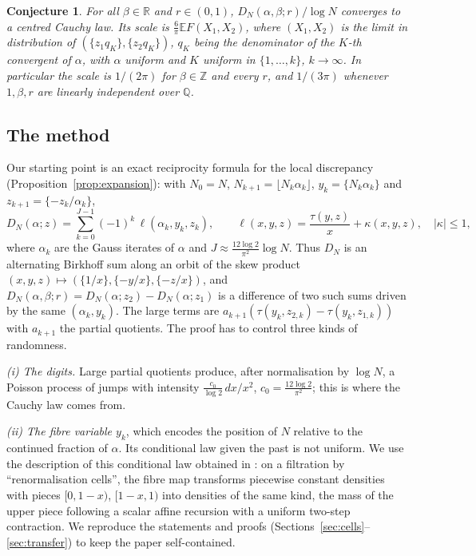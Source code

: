 \documentclass[11pt]{amsart}
\newtheorem{conjecture}[theorem]{Conjecture}
\theoremstyle{definition}
\numberwithin{equation}{section}
\newcommand{\R}{\mathbb{R}}
\newcommand{\Z}{\mathbb{Z}}
\newcommand{\Q}{\mathbb{Q}}
\newcommand{\E}{\mathbb{E}}
\newcommand{\fr}[1]{\{#1\}}
\begin{document}
\begin{conjecture}\label{conj:irr}
For all $\beta\in\R$ and $r\in(0,1)$, $D_N(\alpha,\beta;r)/\log N$ converges to a centred Cauchy law. Its scale is $\frac6\pi\E F(X_1,X_2)$,
where $(X_1,X_2)$ is the limit in distribution of $(\fr{z_1q_K},\fr{z_2q_K})$, $q_K$ being the denominator of the $K$-th convergent of $\alpha$,
with $\alpha$ uniform and $K$ uniform in $\{1,\dots,k\}$, $k\to\infty$. In particular the scale is $1/(2\pi)$ for $\beta\in\Z$ and every $r$,
and $1/(3\pi)$ whenever $1,\beta,r$ are linearly independent over $\Q$.
\end{conjecture}

\subsection*{The method}
Our starting point is an exact reciprocity formula for the local discrepancy (Proposition~\ref{prop:expansion}): with $N_0=N$,
$N_{k+1}=\lfloor N_k\alpha_k\rfloor$, $y_k=\fr{N_k\alpha_k}$ and $z_{k+1}=\fr{-z_k/\alpha_k}$,
\[
D_N(\alpha;z)=\sum_{k=0}^{J-1}(-1)^k\,\ell(\alpha_k,y_k,z_k),\qquad \ell(x,y,z)=\frac{\tau(y,z)}{x}+\kappa(x,y,z),\quad|\kappa|\le1,
\]
where $\alpha_k$ are the Gauss iterates of $\alpha$ and $J\approx\frac{12\log2}{\pi^2}\log N$. Thus $D_N$ is an alternating Birkhoff sum along an
orbit of the skew product $(x,y,z)\mapsto(\fr{1/x},\fr{-y/x},\fr{-z/x})$, and $D_N(\alpha,\beta;r)=D_N(\alpha;z_2)-D_N(\alpha;z_1)$ is a difference
of two such sums driven by the same $(\alpha_k,y_k)$. The large terms are $a_{k+1}(\tau(y_k,z_{2,k})-\tau(y_k,z_{1,k}))$ with $a_{k+1}$ the
partial quotients. The proof has to control three kinds of randomness.

\emph{(i) The digits.} Large partial quotients produce, after normalisation by $\log N$, a Poisson process of jumps with intensity
$\frac{c_0}{\log2}\,dx/x^2$, $c_0=\frac{12\log2}{\pi^2}$; this is where the Cauchy law comes from.

\emph{(ii) The fibre variable $y_k$}, which encodes the position of $N$ relative to the continued fraction of $\alpha$. Its conditional law
given the past is not uniform. We use the description of this conditional law obtained in \cite{E1002}: on a filtration by
``renormalisation cells'', the fibre map transforms piecewise constant densities with pieces $[0,1-x)$, $[1-x,1)$ into densities of the
same kind, the mass of the upper piece following a scalar affine recursion with a uniform two-step contraction. We reproduce the
statements and proofs (Sections~\ref{sec:cells}--\ref{sec:transfer}) to keep the paper self-contained.
\end{document}
